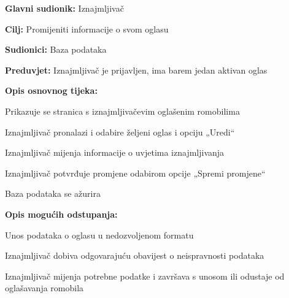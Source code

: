 						\noindent {}
						\begin{packed_item}
							
							\item \textbf{Glavni sudionik: }Iznajmljivač
							\item  \textbf{Cilj: }Promijeniti informacije o svom oglasu
							\item  \textbf{Sudionici: }Baza podataka
							\item  \textbf{Preduvjet: }Iznajmljivač je prijavljen, ima barem jedan aktivan oglas
							\item  \textbf{Opis osnovnog tijeka:}
							
							\item[] \begin{packed_enum}
								\item Prikazuje se stranica s iznajmljivačevim oglašenim romobilima
								\item Iznajmljivač pronalazi i odabire željeni oglas i opciju „Uredi“
								\item Iznajmljivač mijenja informacije o uvjetima iznajmljivanja
								\item Iznajmljivač potvrđuje promjene odabirom opcije „Spremi promjene“
								\item Baza podataka se ažurira
								
							\end{packed_enum}	
							\item  \textbf{Opis mogućih odstupanja:}
							
							\item[] \begin{packed_item}
								
								\item[3.a] Unos podataka o oglasu u nedozvoljenom formatu
								\item[] \begin{packed_enum}
									
									\item Iznajmljivač dobiva odgovarajuću obavijest o neispravnosti podataka
									\item Iznajmljivač mijenja potrebne podatke i završava s unosom ili odustaje od oglašavanja romobila
									
								\end{packed_enum}
								
							\end{packed_item}
						\end{packed_item}
